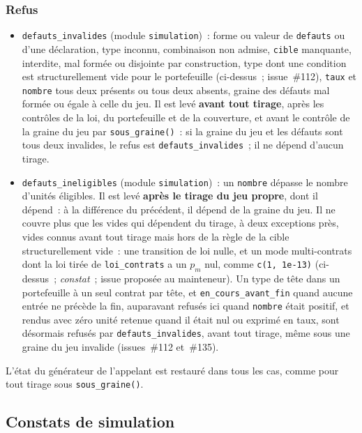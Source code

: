 \documentclass[a4paper,11pt]{article}
\newcommand{\code}[1]{\texttt{\small #1}}
\begin{document}
\subsubsection*{Refus}

\begin{itemize}[leftmargin=*, itemsep=2pt]
  \item \code{defauts\_invalides} (module \code{simulation})~: forme ou
    valeur de \code{defauts} ou d'une déclaration, type inconnu,
    combinaison non admise, \code{cible} manquante, interdite, mal formée
    ou disjointe par construction, type dont une condition est
    structurellement vide pour le portefeuille (ci-dessus~; issue~\#112),
    \code{taux} et \code{nombre} tous deux
    présents ou tous deux absents, graine des défauts mal formée ou égale à
    celle du jeu. Il est levé \textbf{avant tout tirage}, après les
    contrôles de la loi, du portefeuille et de la couverture, et avant le
    contrôle de la graine du jeu par \code{sous\_graine()}~: si la graine
    du jeu et les défauts sont tous deux invalides, le refus est
    \code{defauts\_invalides}~; il ne dépend d'aucun tirage.
  \item \code{defauts\_ineligibles} (module \code{simulation})~: un
    \code{nombre} dépasse le nombre d'unités éligibles. Il est levé
    \textbf{après le tirage du jeu propre}, dont il dépend~: à la
    différence du précédent, il dépend de la graine du jeu. Il ne couvre
    plus que les vides qui dépendent du tirage, à deux exceptions près,
    vides connus avant tout tirage mais hors de la règle de la cible
    structurellement vide~: une transition de loi nulle, et un mode
    multi-contrats dont la loi tirée de \code{loi\_contrats} a un $p_m$
    nul, comme \code{c(1, 1e-13)} (ci-dessus~; \emph{constat}~; issue
    proposée au mainteneur). Un type de tête dans un
    portefeuille à un seul contrat par tête, et \code{en\_cours\_avant\_fin}
    quand aucune entrée ne précède la fin, auparavant refusés ici quand
    \code{nombre} était positif, et rendus avec zéro unité retenue quand il
    était nul ou exprimé en taux, sont désormais refusés par
    \code{defauts\_invalides}, avant tout tirage, même sous une graine du
    jeu invalide (issues~\#112 et~\#135).
\end{itemize}

\noindent
L'état du générateur de l'appelant est restauré dans tous les cas, comme
pour tout tirage sous \code{sous\_graine()}.

\subsection{Constats de simulation}
\label{sec:constats-simulation}
\end{document}
